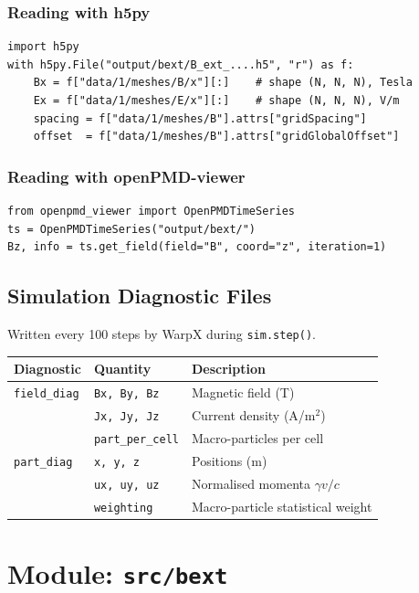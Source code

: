 \documentclass[11pt, a4paper]{article}
\begin{document}
\subsubsection*{Reading with h5py}
\begin{lstlisting}[style=python]
import h5py
with h5py.File("output/bext/B_ext_....h5", "r") as f:
    Bx = f["data/1/meshes/B/x"][:]    # shape (N, N, N), Tesla
    Ex = f["data/1/meshes/E/x"][:]    # shape (N, N, N), V/m
    spacing = f["data/1/meshes/B"].attrs["gridSpacing"]
    offset  = f["data/1/meshes/B"].attrs["gridGlobalOffset"]
\end{lstlisting}

\subsubsection*{Reading with openPMD-viewer}
\begin{lstlisting}[style=python]
from openpmd_viewer import OpenPMDTimeSeries
ts = OpenPMDTimeSeries("output/bext/")
Bz, info = ts.get_field(field="B", coord="z", iteration=1)
\end{lstlisting}

\subsection{Simulation Diagnostic Files}

Written every 100 steps by WarpX during \texttt{sim.step()}.

\begin{longtable}{L{3cm} L{3.5cm} L{7cm}}
\toprule
\textbf{Diagnostic} & \textbf{Quantity} & \textbf{Description} \\
\midrule
\texttt{field\_diag} & \texttt{Bx, By, Bz} & Magnetic field (T) \\
                     & \texttt{Jx, Jy, Jz} & Current density (A/m$^2$) \\
                     & \texttt{part\_per\_cell} & Macro-particles per cell \\
\midrule
\texttt{part\_diag} & \texttt{x, y, z} & Positions (m) \\
                    & \texttt{ux, uy, uz} & Normalised momenta $\gamma v/c$ \\
                    & \texttt{weighting} & Macro-particle statistical weight \\
\bottomrule
\end{longtable}

\section{Module: \texttt{src/bext}}
\end{document}
